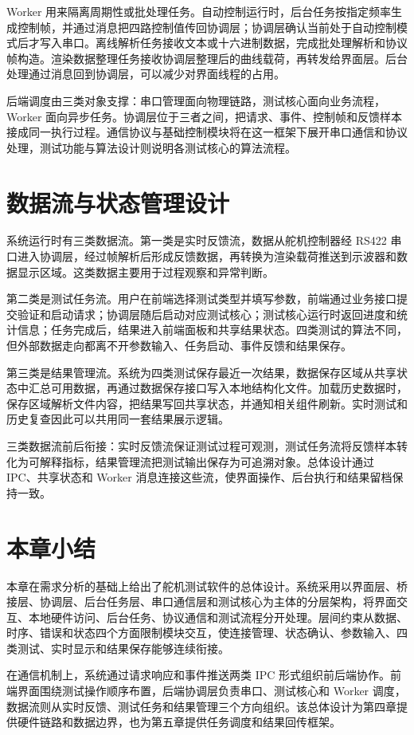 Worker 用来隔离周期性或批处理任务。自动控制运行时，后台任务按指定频率生成控制帧，并通过消息把四路控制值传回协调层；协调层确认当前处于自动控制模式后才写入串口。离线解析任务接收文本或十六进制数据，完成批处理解析和协议帧构造。渲染数据整理任务接收协调层整理后的曲线载荷，再转发给界面层。后台处理通过消息回到协调层，可以减少对界面线程的占用。

后端调度由三类对象支撑：串口管理面向物理链路，测试核心面向业务流程，Worker 面向异步任务。协调层位于三者之间，把请求、事件、控制帧和反馈样本接成同一执行过程。通信协议与基础控制模块将在这一框架下展开串口通信和协议处理，测试功能与算法设计则说明各测试核心的算法流程。

\section{数据流与状态管理设计}

系统运行时有三类数据流。第一类是实时反馈流，数据从舵机控制器经 RS422 串口进入协调层，经过帧解析后形成反馈数据，再转换为渲染载荷推送到示波器和数据显示区域。这类数据主要用于过程观察和异常判断。

第二类是测试任务流。用户在前端选择测试类型并填写参数，前端通过业务接口提交验证和启动请求；协调层随后启动对应测试核心；测试核心运行时返回进度和统计信息；任务完成后，结果进入前端面板和共享结果状态。四类测试的算法不同，但外部数据走向都离不开参数输入、任务启动、事件反馈和结果保存。

第三类是结果管理流。系统为四类测试保存最近一次结果，数据保存区域从共享状态中汇总可用数据，再通过数据保存接口写入本地结构化文件。加载历史数据时，保存区域解析文件内容，把结果写回共享状态，并通知相关组件刷新。实时测试和历史复查因此可以共用同一套结果展示逻辑。

三类数据流前后衔接：实时反馈流保证测试过程可观测，测试任务流将反馈样本转化为可解释指标，结果管理流把测试输出保存为可追溯对象。总体设计通过 IPC、共享状态和 Worker 消息连接这些流，使界面操作、后台执行和结果留档保持一致。

\section{本章小结}

本章在需求分析的基础上给出了舵机测试软件的总体设计。系统采用以界面层、桥接层、协调层、后台任务层、串口通信层和测试核心为主体的分层架构，将界面交互、本地硬件访问、后台任务、协议通信和测试流程分开处理。层间约束从数据、时序、错误和状态四个方面限制模块交互，使连接管理、状态确认、参数输入、四类测试、实时显示和结果保存能够连续衔接。

在通信机制上，系统通过请求响应和事件推送两类 IPC 形式组织前后端协作。前端界面围绕测试操作顺序布置，后端协调层负责串口、测试核心和 Worker 调度，数据流则从实时反馈、测试任务和结果管理三个方向组织。该总体设计为第四章提供硬件链路和数据边界，也为第五章提供任务调度和结果回传框架。
